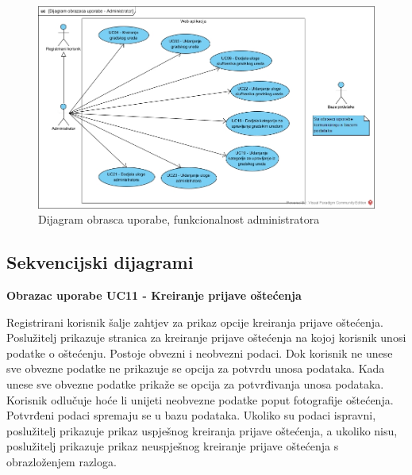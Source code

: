\begin{figure}[H]
	\includegraphics[scale=0.5]{slike/UC-administrator} %
	\centering
	\caption{Dijagram obrasca uporabe, funkcionalnost administratora}
	\label{fig:DijagramObrascaUporabeAdministrator}
\end{figure}

\eject

\subsection{Sekvencijski dijagrami}

\noindent \textbf{Obrazac uporabe UC11 - Kreiranje prijave oštećenja}

Registrirani korisnik šalje zahtjev za prikaz opcije kreiranja prijave oštećenja. Poslužitelj prikazuje stranica za kreiranje 
prijave oštećenja na kojoj korisnik unosi podatke o oštećenju. Postoje obvezni i neobvezni podaci. Dok korisnik ne unese sve 
obvezne podatke ne prikazuje se opcija za potvrdu unosa podataka. Kada unese sve obvezne podatke prikaže se opcija za potvrđivanja 
unosa podataka. Korisnik odlučuje hoće li unijeti neobvezne podatke poput fotografije oštećenja. Potvrđeni podaci spremaju se u 
bazu podataka. Ukoliko su podaci ispravni, poslužitelj prikazuje prikaz uspješnog kreiranja prijave oštećenja, a ukoliko nisu, 
poslužitelj prikazuje prikaz neuspješnog kreiranje prijave oštećenja s obrazloženjem razloga.

